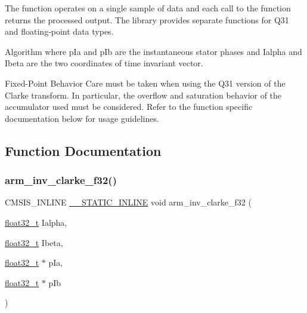 The function operates on a single sample of data and each call to the function returns the processed output. The library provides separate functions for Q31 and floating-\/point data types. \begin{DoxyParagraph}{Algorithm}
 where {\ttfamily p\+Ia} and {\ttfamily p\+Ib} are the instantaneous stator phases and {\ttfamily Ialpha} and {\ttfamily Ibeta} are the two coordinates of time invariant vector. 
\end{DoxyParagraph}
\begin{DoxyParagraph}{Fixed-\/\+Point Behavior}
Care must be taken when using the Q31 version of the Clarke transform. In particular, the overflow and saturation behavior of the accumulator used must be considered. Refer to the function specific documentation below for usage guidelines. 
\end{DoxyParagraph}


\subsection{Function Documentation}
\mbox{\label{group__inv__clarke_ga945eb24e625a57c7c3be8a6e655646e3}} 
\subsubsection{\texorpdfstring{arm\+\_\+inv\+\_\+clarke\+\_\+f32()}{arm\_inv\_clarke\_f32()}}
{\footnotesize\ttfamily C\+M\+S\+I\+S\+\_\+\+I\+N\+L\+I\+NE \mbox{\hyperlink{cmsis__iccarm_8h_aba87361bfad2ae52cfe2f40c1a1dbf9c}{\+\_\+\+\_\+\+S\+T\+A\+T\+I\+C\+\_\+\+I\+N\+L\+I\+NE}} void arm\+\_\+inv\+\_\+clarke\+\_\+f32 (\begin{DoxyParamCaption}\item[{\mbox{\hyperlink{arm__math_8h_a4611b605e45ab401f02cab15c5e38715}{float32\+\_\+t}}}]{Ialpha,  }\item[{\mbox{\hyperlink{arm__math_8h_a4611b605e45ab401f02cab15c5e38715}{float32\+\_\+t}}}]{Ibeta,  }\item[{\mbox{\hyperlink{arm__math_8h_a4611b605e45ab401f02cab15c5e38715}{float32\+\_\+t}} $\ast$}]{p\+Ia,  }\item[{\mbox{\hyperlink{arm__math_8h_a4611b605e45ab401f02cab15c5e38715}{float32\+\_\+t}} $\ast$}]{p\+Ib }\end{DoxyParamCaption})}



